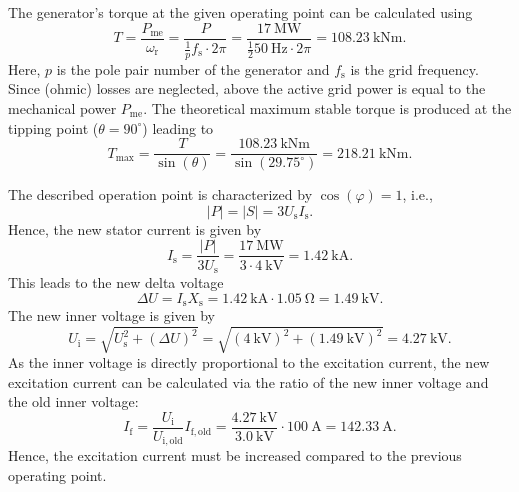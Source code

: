 
\begin{solutionblock}
    The generator's torque at the given operating point can be calculated using
    $$
        T = \frac{P_{\mathrm{me}}}{\omega_{\mathrm{r}}} = \frac{P}{\frac{1}{p}f_\mathrm{s}\cdot 2\pi} = \frac{\SI{17}{\mega\watt}}{\frac{1}{2}\SI{50}{\hertz}\cdot 2\pi} = \SI{108.23}{\kilo\newton\meter}.
    $$
    Here, $p$ is the pole pair number of the generator and $f_\mathrm{s}$ is the grid frequency. Since (ohmic) losses are neglected, above the active grid power is equal to the mechanical power $P_{\mathrm{me}}$. The theoretical maximum stable torque is produced at the tipping point ($\theta = 90^\circ$) leading to
    $$
        T_{\mathrm{max}} = \frac{T}{\sin(\theta)} = \frac{\SI{108.23}{\kilo\newton\meter}}{\sin(29.75^\circ)} = \SI{218.21}{\kilo\newton\meter}.
    $$
\end{solutionblock}


\begin{solutionblock}
    The described operation point is characterized by $\cos(\varphi)=1$, i.e.,
    $$
        |P|=|S|=3U_\mathrm{s}I_\mathrm{s}.
    $$
    Hence, the new stator current is given by
    $$
        I_\mathrm{s} = \frac{|P|}{3U_\mathrm{s}} = \frac{\SI{17}{\mega\watt}}{3\cdot\SI{4}{\kilo\volt}} = \SI{1.42}{\kilo\ampere}.
    $$
    This leads to the new delta voltage
    $$
        \Delta U = I_\mathrm{s} X_\mathrm{s} = \SI{1.42}{\kilo\ampere}\cdot\SI{1.05}{\ohm} = \SI{1.49}{\kilo\volt}.
    $$
    The new inner voltage is given by
    $$
        U_\mathrm{i} = \sqrt{U^2_\mathrm{s} + (\Delta U)^2} = \sqrt{(\SI{4}{\kilo\volt})^2 + (\SI{1.49}{\kilo\volt})^2} = \SI{4.27}{\kilo\volt}.
    $$
    As the inner voltage is directly proportional to the excitation current, the new excitation current can be calculated via the ratio of the new inner voltage and the old inner voltage:
    $$
        I_\mathrm{f} = \frac{U_\mathrm{i}}{U_\mathrm{i,old}} I_\mathrm{f,old} = \frac{\SI{4.27}{\kilo\volt}}{\SI{3.0}{\kilo\volt}} \cdot \SI{100}{\ampere} = \SI{142.33}{\ampere}.
    $$
    Hence, the excitation current must be increased compared to the previous operating point.
\end{solutionblock}

